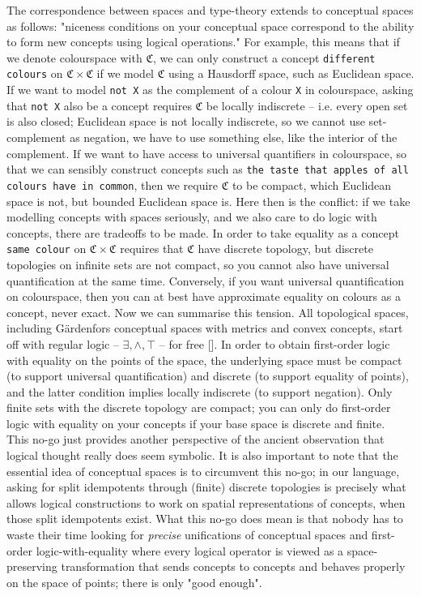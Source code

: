\begin{fullwidth}
The correspondence between spaces and type-theory extends to conceptual spaces as follows: "niceness conditions on your conceptual space correspond to the ability to form new concepts using logical operations." For example, this means that if we denote colourspace with $\mathfrak{C}$, we can only construct a concept \texttt{different colours} on $\mathfrak{C} \times \mathfrak{C}$ if we model $\mathfrak{C}$ using a Hausdorff space, such as Euclidean space. If we want to model \texttt{not X} as the complement of a colour \texttt{X} in colourspace, asking that \texttt{not X} also be a concept requires $\mathfrak{C}$ be locally indiscrete -- i.e. every open set is also closed; Euclidean space is not locally indiscrete, so we cannot use set-complement as negation, we have to use something else, like the interior of the complement. If we want to have access to universal quantifiers in colourspace, so that we can sensibly construct concepts such as \texttt{the taste that apples of all colours have in common}, then we require $\mathfrak{C}$ to be compact, which Euclidean space is not, but bounded Euclidean space is. Here then is the conflict: if we take modelling concepts with spaces seriously, and we also care to do logic with concepts, there are tradeoffs to be made. In order to take equality as a concept \texttt{same colour} on $\mathfrak{C} \times \mathfrak{C}$ requires that $\mathfrak{C}$ have discrete topology, but discrete topologies on infinite sets are not compact, so you cannot also have universal quantification at the same time. Conversely, if you want universal quantification on colourspace, then you can at best have approximate equality on colours as a concept, never exact. Now we can summarise this tension. All topological spaces, including G\"{a}rdenfors conceptual spaces with metrics and convex concepts, start off with regular logic -- $\exists, \wedge, \top$ -- for free []. In order to obtain first-order logic with equality on the points of the space, the underlying space must be compact (to support universal quantification) and discrete (to support equality of points), and the latter condition implies locally indiscrete (to support negation). Only finite sets with the discrete topology are compact; you can only do first-order logic with equality on your concepts if your base space is discrete and finite.\\

This no-go just provides another perspective of the ancient observation that logical thought really does seem symbolic. It is also important to note that the essential idea of conceptual spaces is to circumvent this no-go; in our language, asking for split idempotents through (finite) discrete topologies is precisely what allows logical constructions to work on spatial representations of concepts, when those split idempotents exist. What this no-go does mean is that nobody has to waste their time looking for \emph{precise} unifications of conceptual spaces and first-order logic-with-equality where every logical operator is viewed as a space-preserving transformation that sends concepts to concepts and behaves properly on the space of points; there is only "good enough".


\end{fullwidth}

